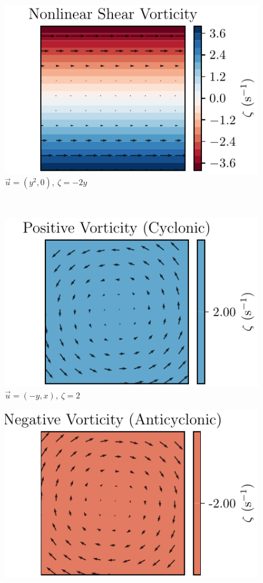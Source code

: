 \begin{figure}
\begin{minipage}{0.32\linewidth}
		\includegraphics[width=\linewidth]{papers/rossby/images/vorticity_plot2.pdf}\\
		{\small \( \vec{u} = (y^2,0),\ \zeta = -2y\)}
	\end{minipage}
	\\[15pt]
	\begin{minipage}{0.32\linewidth}
		\centering
		\includegraphics[width=\linewidth]{papers/rossby/images/vorticity_plot3.pdf}\\
		{\small \( \vec{u} = (-y,x),\ \zeta = 2\)}
	\end{minipage}
	\begin{minipage}{0.32\linewidth}
		\centering
		\includegraphics[width=\linewidth]{papers/rossby/images/vorticity_plot4.pdf}\\

\end{minipage}
\end{figure}
